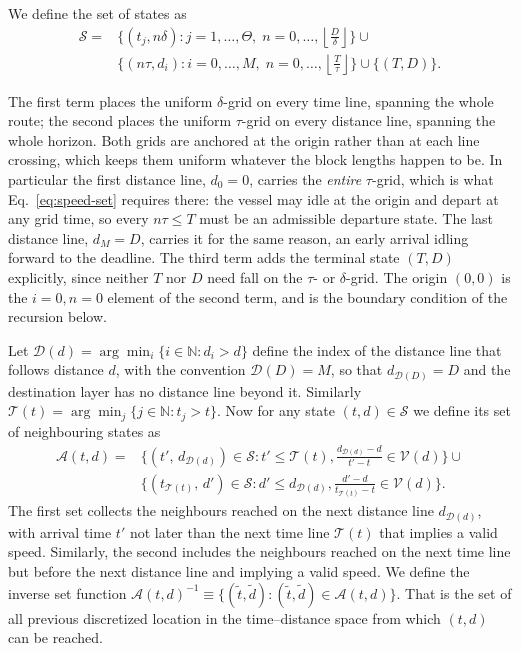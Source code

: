 \documentclass[review,authoryear]{elsarticle}
\begin{document}
We define the set of states as
\begin{equation}
	\label{eq:state-space}
	\begin{aligned}
		\mathcal{S}
		={}& \biggl\{
		(t_j, n\delta):
		j=1,\ldots,\Theta,\;
		n=0,\ldots,
		\left\lfloor\frac{D}{\delta}\right\rfloor
		\biggr\} \cup \\
		&{}
		\biggl\{
		(n\tau,d_i):
		i=0,\ldots,M,\;
		n=0,\ldots,
		\left\lfloor\frac{T}{\tau}\right\rfloor
		\biggr\} \cup
		\biggl\{
		(T,D)
		\biggr\}.
	\end{aligned}
\end{equation}

The first term places the uniform $\delta$-grid on every time line, spanning the whole route; the
second places the uniform $\tau$-grid on every distance line, spanning the whole horizon. Both grids
are anchored at the origin rather than at each line crossing, which keeps them uniform whatever the
block lengths happen to be. In particular the first distance line, $d_0=0$, carries the \emph{entire}
$\tau$-grid, which is what Eq.~\eqref{eq:speed-set} requires there: the vessel may idle at the origin
and depart at any grid time, so every $n\tau \le T$ must be an admissible departure state. The last
distance line, $d_M=D$, carries it for the same reason, an early arrival idling forward to the
deadline. The third term adds the terminal state $(T,D)$ explicitly, since neither $T$ nor $D$ need
fall on the $\tau$- or $\delta$-grid. The origin $(0,0)$ is the $i=0,n=0$ element of the second term,
and is the boundary condition of the recursion below.


Let $\mathcal{D}(d) = \arg\min_{i} \{i \in \mathbb{N} : d_i > d\}$ define the index of the distance line that follows distance $d$, with the convention $\mathcal{D}(D)=M$, so that $d_{\mathcal{D}(D)}=D$ and the destination layer has no distance line beyond it. Similarly $\mathcal{T}(t) = \arg\min_{j} \{j \in \mathbb{N} : t_j > t\}$.  Now for any state $(t,d)\in\mathcal{S}$ we define its set of neighbouring states as
\begin{equation}
\label{eq:neighbors}
\begin{aligned}
\mathcal{A}(t,d) ={}&
\biggl\{ (t',\, d_{\mathcal{D}(d)}) \in \mathcal{S} : t' \le  \mathcal{T}(t), \frac{d_{\mathcal{D}(d)}-d}{t'-t} \in \mathcal{V}(d) \biggr\} \cup \\
&\biggl\{ (t_{\mathcal{T}(t)},\, d')  \in \mathcal{S}: d' \le d_{\mathcal{D}(d)}, \frac{d'-d}{t_{\mathcal{T}(t)}-t} \in \mathcal{V}(d)  \biggr\}.
\end{aligned}
\end{equation}
The first set collects the neighbours reached on the next distance line $d_{\mathcal{D}(d)}$, with 
arrival time $t'$ not later than the next time line  $\mathcal{T}(t)$ that implies a valid speed.
Similarly, the second includes  the neighbours reached on the next time line but before the next distance line and implying a valid speed.  
 We define the inverse set function $\mathcal{A}(t,d)^{-1} \equiv \{(\tilde t, \tilde d) : (\tilde t, \tilde d) \in \mathcal{A}(t,d)  \}$. That is the set of all previous discretized location in the time--distance space from which $(t,d)$ can be reached.
\end{document}
